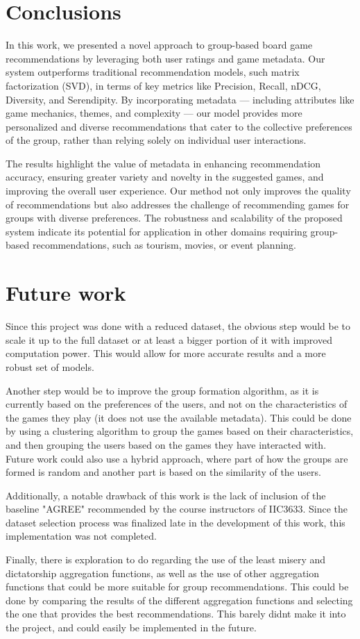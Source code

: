 \documentclass{article}
\begin{document}
\section{Conclusions}

In this work, we presented a novel approach to group-based board game recommendations by leveraging both user ratings and game metadata. Our system outperforms traditional recommendation models, such matrix factorization (SVD), in terms of key metrics like Precision, Recall, nDCG, Diversity, and Serendipity. By incorporating metadata — including attributes like game mechanics, themes, and complexity — our model provides more personalized and diverse recommendations that cater to the collective preferences of the group, rather than relying solely on individual user interactions.

The results highlight the value of metadata in enhancing recommendation accuracy, ensuring greater variety and novelty in the suggested games, and improving the overall user experience. Our method not only improves the quality of recommendations but also addresses the challenge of recommending games for groups with diverse preferences. The robustness and scalability of the proposed system indicate its potential for application in other domains requiring group-based recommendations, such as tourism, movies, or event planning.

\section{Future work}

Since this project was done with a reduced dataset, the obvious step would be to scale it up to the full dataset or at least a bigger portion of it with improved computation power. This would allow for more accurate results and a more robust set of models.

Another step would be to improve the group formation algorithm, as it is currently based on the preferences of the users, and not on the characteristics of the games they play (it does not use the available metadata). This could be done by using a clustering algorithm to group the games based on their characteristics, and then grouping the users based on the games they have interacted with. Future work could also use a hybrid approach, where part of how the groups are formed is random and another part is based on the similarity of the users.

Additionally, a notable drawback of this work is the lack of inclusion of the baseline "AGREE" recommended by the course instructors of IIC3633. Since the dataset selection process was finalized late in the development of this work, this implementation was not completed.

Finally, there is exploration to do regarding the use of the least misery and dictatorship aggregation functions, as well as the use of other aggregation functions that could be more suitable for group recommendations. This could be done by comparing the results of the different aggregation functions and selecting the one that provides the best recommendations. This barely didnt make it into the project, and could easily be implemented in the future.



\end{document}
